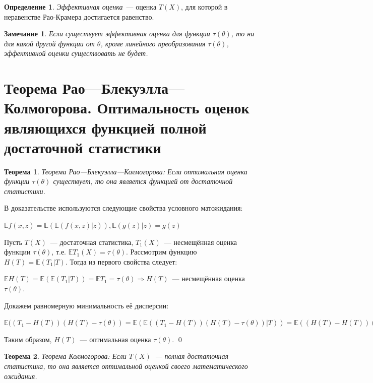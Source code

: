 \documentclass[oneside,final,14pt]{extreport}
\renewenvironment{proof}{{\bfseries Доказательство.}}{\qed}
\newtheorem{thm}{Теорема}[section]
\newtheorem*{rmrk}{Замечание}
\theoremstyle{definition}
\newtheorem{defn}{Определение}[section]
\begin{document}
\begin{defn}
{\it Эффективная оценка}~--- оценка \(T(X)\), для которой в неравенстве Рао-Крамера достигается равенство.
\end{defn}

\begin{rmrk}
Если существует эффективная оценка для функции \(\tau(\theta)\), то ни для какой другой функции от \(\theta\), кроме линейного преобразования \(\tau(\theta)\), эффективной оценки существовать не будет. 
\end{rmrk}

\section{Теорема Рао—Блекуэлла—Колмогорова. Оптимальность оценок являющихся функцией полной достаточной статистики}

\begin{thm}
{\it Теорема Рао—Блекуэлла—Колмогорова:} Если оптимальная оценка функции \(\tau(\theta)\) существует, то она является функцией от достаточной статистики.
\end{thm}

\begin{proof}
В доказательстве используются следующие свойства условного матожидания: 

\( \mathbb{E} f(x, z)=\mathbb{E}(\mathbb{E}(f(x, z) | z)),
\mathbb{E}(g(z) | z)=g(z)\)

Пусть \(T(X)\)~--- достаточная статистика, \(T_1(X)\)~--- несмещённая оценка функции \(\tau(\theta)\), т.е. \(\mathbb{E} T_{1}(X)=\tau(\theta)\). Рассмотрим функцию \( H(T)=\mathbb{E}\left(T_{1} | T\right) \). Тогда из первого свойства следует:

\( \mathbb{E} H(T)=\mathbb{E}\left(\mathbb{E}\left(T_{1} | T\right)\right)=\mathbb{E} T_{1}=\tau(\theta) \Rightarrow H(T)\)~--- несмещённая оценка \(\tau(\theta)\).

Докажем равномерную минимальность её дисперсии:

\( \mathbb{E}((T_{1}-H(T))(H(T)-\tau(\theta))=\mathbb{E}(\mathbb{E}((T_{1}-H(T))(H(T)-\tau(\theta)) | T)) =\mathbb{E}((H(T)-H(T))(H(T)-\tau(\theta)))=0 \)

Таким образом, \(H(T)\)~--- оптимальная оценка \(\tau(\theta)\).
\end{proof}

\begin{thm}
{\it Теорема Колмогорова:} Если \(T(X)\)~--- полная достаточная статистика, то она является оптимальной оценкой своего математического ожидания.
\end{thm}
\end{document}

